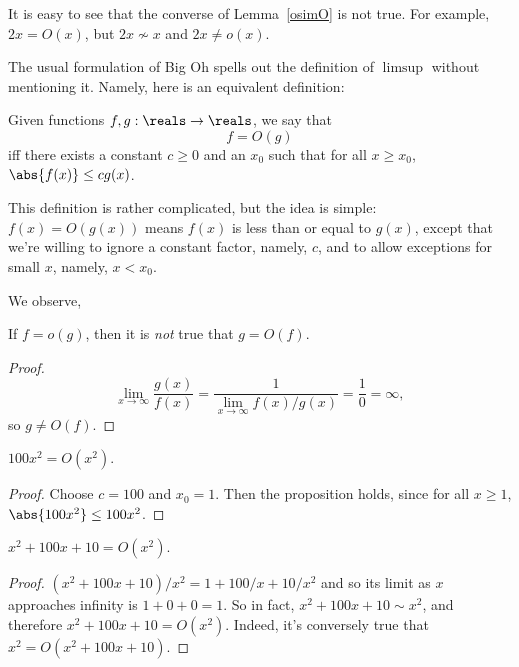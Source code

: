 It is easy to see that the converse of Lemma~\ref{osimO} is not true.  For
example, $2x = O(x)$, but $2x \not\sim x$ and $2x \neq o(x)$.

The usual formulation of Big Oh spells out the definition of $\limsup$
without mentioning it.  Namely, here is an equivalent definition:
\begin{definition}\label{def:O}
Given functions $f, g : \reals \to \reals$, we say that
\[
f = O(g)
\]
iff there exists a constant $c \geq 0$ and an $x_0$ such that for all $x \geq
x_0$, $\abs{f(x)} \leq c g(x)$.
\end{definition}

This definition is rather complicated, but the idea is simple: $f(x) =
O(g(x))$ means $f(x)$ is less than or equal to $g(x)$, except that we're
willing to ignore a constant factor, namely, $c$, and to allow exceptions for
small $x$, namely, $x < x_0$.

We observe,
\begin{lemma}
If $f = o(g)$, then it is \emph{not} true that $g = O(f)$.
\end{lemma}
\begin{proof}
\[
\lim_{x \rightarrow \infty} \frac{g(x)}{f(x)} =
 \frac{1}{\lim_{x \rightarrow \infty} f(x)/g(x)} =
 \frac{1}{0} = \infty,
\]
so $g \neq O(f)$.

\iffalse
We will prove the equivalent contrapositive, i.e., that
if $g=O(f)$ then it is not true that $f=o(g)$.  If
$g=O(f)$ then there
exists a constant $c \geq 0$ and an $x_0$ such that for all $x \geq
x_0$, $\abs{g(x)} \leq c f(x)$.
Then for all $x \geq x_0$, we have that $f(x)/|g(x)| = f(x)/g(x) >c>0$
(the first equality uses the nonnegativity of $g$).
Thus $\lim_{x \rightarrow \infty} f(x)/g(x) >0$ and so it is not true that
$f=o(g)$.
\fi

\end{proof}

\begin{proposition}
$100x^2 = O(x^2)$.
\end{proposition}

\begin{proof}
Choose $c = 100$ and $x_0 = 1$.  Then the proposition holds, since for all
$x \geq 1$, $\abs{100x^2} \leq 100 x^2$.
\end{proof}

\begin{proposition}\label{x2O}
$x^2 + 100x + 10 = O(x^2)$.
\end{proposition}

\begin{proof}
$(x^2 + 100x + 10)/x^2 = 1 + 100/x + 10/x^2$ and so its limit as $x$
approaches infinity is $1 + 0 + 0 = 1$.  So in fact, $x^2 + 100x + 10 \sim
x^2$, and therefore $x^2 + 100x + 10 = O(x^2)$.  Indeed, it's conversely
true that $x^2= O(x^2 + 100x + 10)$.
\end{proof}

